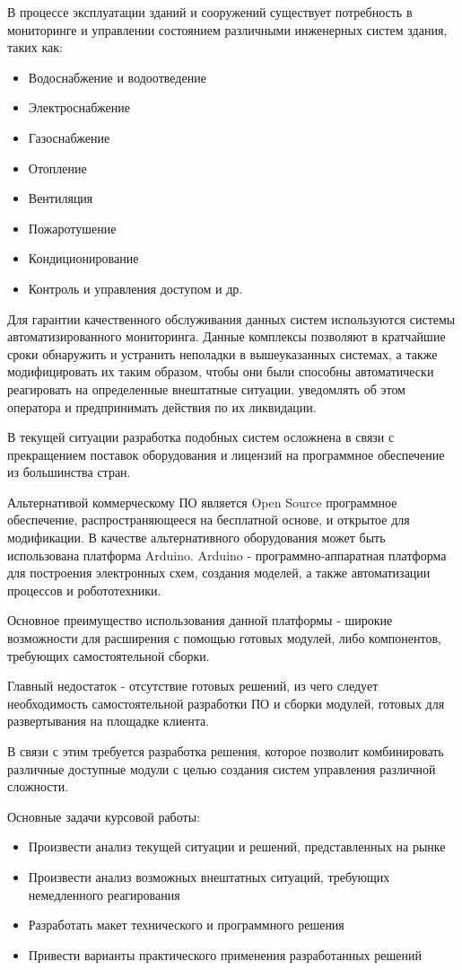 В процессе эксплуатации зданий и сооружений существует потребность в мониторинге и управлении состоянием различными инженерных систем здания, таких как:

\begin{itemize}
	\itemsep0em
	\item Водоснабжение и водоотведение
	\item Электроснабжение
	\item Газоснабжение
	\item Отопление
	\item Вентиляция
	\item Пожаротушение
	\item Кондиционирование
	\item Контроль и управления доступом и др.
\end{itemize}

Для гарантии качественного обслуживания данных систем используются системы автоматизированного мониторинга.
Данные комплексы позволяют в кратчайшие сроки обнаружить и устранить неполадки в вышеуказанных системах, а также модифицировать их таким образом, чтобы они были способны автоматически реагировать на определенные внештатные ситуации, уведомлять об этом оператора и предпринимать действия по их ликвидации.

В текущей ситуации разработка подобных систем осложнена в связи с прекращением поставок оборудования и лицензий на программное обеспечение из большинства стран.

Альтернативой коммерческому ПО является Open Source программное обеспечение, распространяющееся на бесплатной основе, и открытое для модификации.
В качестве альтернативного оборудования может быть использована платформа Arduino.
Arduino - программно-аппаратная платформа для построения электронных схем, создания моделей, а также автоматизации процессов и робототехники.

Основное преимущество использования данной платформы - широкие возможности для расширения с помощью готовых модулей, либо компонентов, требующих самостоятельной сборки.

Главный недостаток - отсутствие готовых решений, из чего следует необходимость самостоятельной разработки ПО и сборки модулей, готовых для развертывания на площадке клиента.

В связи с этим требуется разработка решения, которое позволит комбинировать различные доступные модули с целью создания систем управления различной сложности.

Основные задачи курсовой работы:
\begin{itemize}
	\itemsep0em
	\item Произвести анализ текущей ситуации и решений, представленных на рынке
	\item Произвести анализ возможных внештатных ситуаций, требующих немедленного реагирования
	\item Разработать макет технического и программного решения
	\item Привести варианты практического применения разработанных решений
\end{itemize}